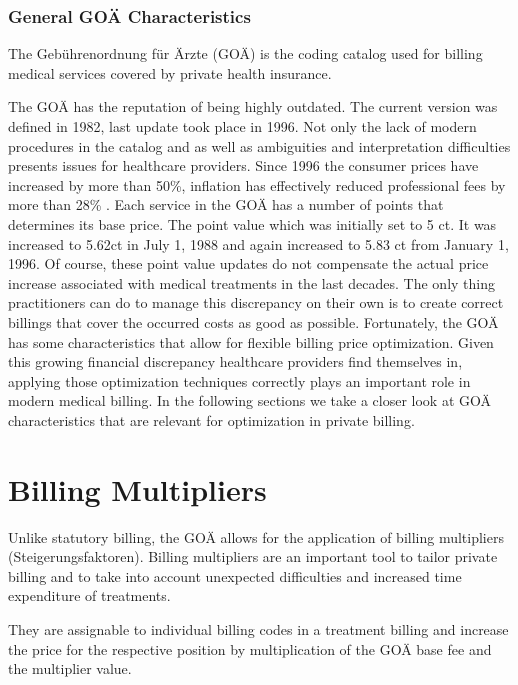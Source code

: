 \subsubsection{General GOÄ Characteristics}
The Gebührenordnung für Ärzte (GOÄ) is the coding catalog used for billing medical services covered by private health insurance.

The GOÄ has the reputation of being highly outdated\cite{heller2015goa}.
The current version was defined in 1982, last update took place in 1996.
Not only the lack of modern procedures in the catalog and as well as ambiguities and interpretation difficulties presents issues for healthcare providers.
Since 1996 the consumer prices have increased by more than 50\%, inflation has effectively reduced professional fees by more than 28\% \cite{schmitzgoa}.
Each service in the GOÄ has a number of points that determines its base price.
The point value which was initially set to 5 ct.
It was increased to 5.62ct in July 1, 1988 and again increased to 5.83 ct from January 1, 1996\cite{hermanns2013bemessung}.
Of course, these point value updates do not compensate the actual price increase associated with medical treatments in the last decades.
The only thing practitioners can do to manage this discrepancy on their own is to create correct billings that cover the occurred costs as good as possible.
Fortunately, the GOÄ has some characteristics that allow for flexible billing price optimization.
Given this growing financial discrepancy healthcare providers find themselves in, applying those optimization techniques correctly plays an important role in modern medical billing.
In the following sections we take a closer look at GOÄ characteristics that are relevant for optimization in private billing.

\section{Billing Multipliers}\label{sec:billing-multipliers}
Unlike statutory billing, the GOÄ allows for the application of billing multipliers (Steigerungsfaktoren).
Billing multipliers are an important tool to tailor private billing and to take into account unexpected difficulties and increased time expenditure of treatments\cite{walter2008abrechnung}.

They are assignable to individual billing codes in a treatment billing and increase the price for the respective position by multiplication of the GOÄ base fee and the multiplier value.

